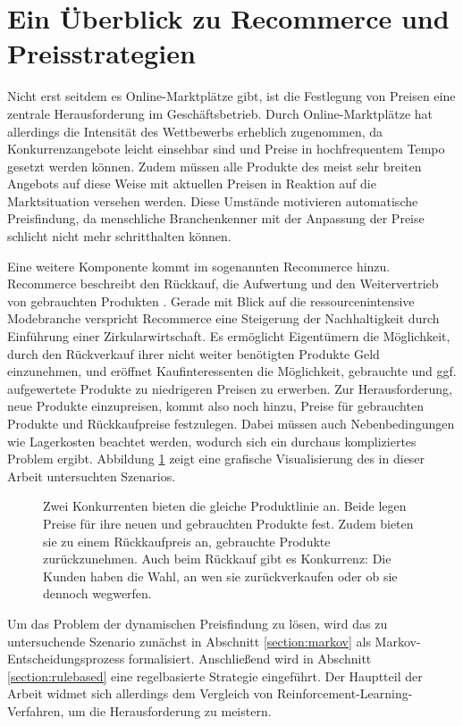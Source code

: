 \section{Ein Überblick zu Recommerce und Preisstrategien}
Nicht erst seitdem es Online-Marktplätze gibt, ist die Festlegung von Preisen eine zentrale Herausforderung im Geschäftsbetrieb.
Durch Online-Marktplätze hat allerdings die Intensität des Wettbewerbs erheblich zugenommen, da Konkurrenzangebote leicht einsehbar sind und Preise in hochfrequentem Tempo gesetzt werden können.
Zudem müssen alle Produkte des meist sehr breiten Angebots auf diese Weise mit aktuellen Preisen in Reaktion auf die Marktsituation versehen werden.
Diese Umstände motivieren automatische Preisfindung, da menschliche Branchenkenner mit der Anpassung der Preise schlicht nicht mehr schritthalten können.

Eine weitere Komponente kommt im sogenannten Recommerce hinzu.
Recommerce beschreibt den Rückkauf, die Aufwertung und den Weitervertrieb von gebrauchten Produkten \cite{deges2019grundlagen}.
Gerade mit Blick auf die ressourcenintensive Modebranche verspricht Recommerce eine Steigerung der Nachhaltigkeit durch Einführung einer Zirkularwirtschaft.
Es ermöglicht Eigentümern die Möglichkeit, durch den Rückverkauf ihrer nicht weiter benötigten Produkte Geld einzunehmen, und eröffnet Kaufinteressenten die Möglichkeit, gebrauchte und ggf. aufgewertete Produkte zu niedrigeren Preisen zu erwerben.
Zur Herausforderung, neue Produkte einzupreisen, kommt also noch hinzu, Preise für gebrauchten Produkte und Rückkaufpreise festzulegen.
Dabei müssen auch Nebenbedingungen wie Lagerkosten beachtet werden, wodurch sich ein durchaus kompliziertes Problem ergibt.
Abbildung \ref{grafic:MarketOverview} zeigt eine grafische Visualisierung des in dieser Arbeit untersuchten Szenarios.

\begin{figure}[htbp]
	\label{grafic:MarketOverview}
	\centering
	
	\caption{
		Zwei Konkurrenten bieten die gleiche Produktlinie an.
		Beide legen Preise für ihre neuen und gebrauchten Produkte fest.
		Zudem bieten sie zu einem Rückkaufpreis an, gebrauchte Produkte zurückzunehmen.
		Auch beim Rückkauf gibt es Konkurrenz: Die Kunden haben die Wahl, an wen sie zurückverkaufen oder ob sie dennoch wegwerfen.
	}
\end{figure}

Um das Problem der dynamischen Preisfindung zu lösen, wird das zu untersuchende Szenario zunächst in Abschnitt \ref{section:markov} als Markov-Entscheidungsprozess formalisiert.
Anschließend wird in Abschnitt \ref{section:rulebased} eine regelbasierte Strategie eingeführt.
Der Hauptteil der Arbeit widmet sich allerdings dem Vergleich von Reinforcement-Learning-Verfahren, um die Herausforderung zu meistern.

